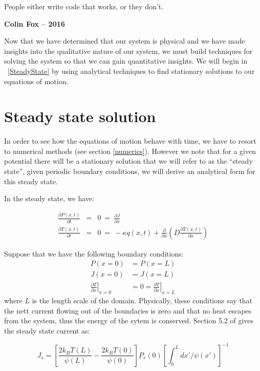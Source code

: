 \setlength{}
\epigraph{People either write code that works, or they don't.}{\textbf{Colin Fox -- 2016}}
Now that we have determined that our system is physical and we have made insights into the qualitative nature of our system, we must build techniques for solving the system so that we can gain quantitative insights. We will begin in ~\autoref{SteadyState} by using analytical techniques to find stationary solutions to our equations of motion.
\section{Steady state solution} \label{SteadyState}
In order to see how the equations of motion behave with time, we have to resort to numerical methods (see section \ref{numerics}). However we note that for a given potential there will be a stationary solution that we will refer to as the ``steady state'', given periodic boundary conditions, we will derive an analytical form for this steady state.

In the steady state, we have:

\begin{eqnarray}
\frac{\partial P(x, t)}{\partial t} &=&  0 \ = \ \frac{\partial J}{\partial x} \label{eqn:SmoluchowskiSteady} \\
\frac{\partial T(x, t)}{\partial t} &=& 0 \ = \ -\kappa q(x,t) + \frac{\partial}{\partial x} \left ( D \frac{\partial T(x, t)}{\partial x} \right ) \label{eqn:TemperatureSteady}
\end{eqnarray}

Suppose that we have the following boundary conditions:
\begin{align}
P(x = 0) & = P(x = L) \\
J(x = 0) & = J(x = L) \\
\left. \frac{\partial T}{\partial x} \right \rvert_{x = 0} & = 0 = \left. \frac{\partial T}{\partial x} \right \rvert_{x = L} \label{eqn:temperatureBoundary}
\end{align}
where $L$ is the length scale of the domain. Physically, these conditions say that the nett current flowing out of the boundaries is zero and that no heat escapes from the system, thus the energy of the sytem is conserved. Section 5.2 of \cite{Gardiner2009} gives the steady state current as:

\begin{equation}
J_s = \left [\frac{2 k_B T(L)}{\psi(L)} - \frac{2 k_B T(0)}{\psi(0)}  \right] P_s(0) \left [\int_0^L dx'/\psi(x') \right]^{-1}
\label{eqn:SteadyCurrent}
\end{equation}

